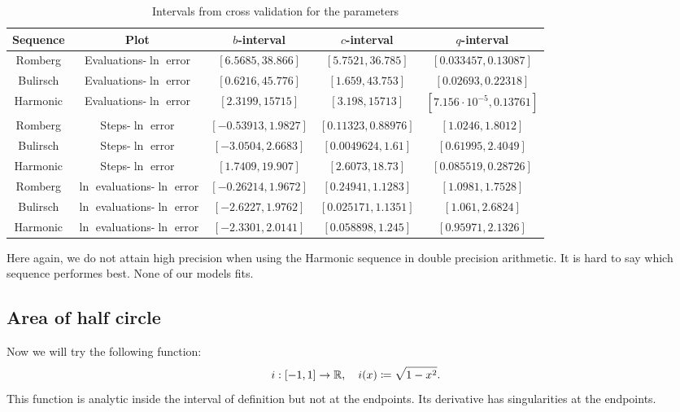 \begin{table}[H]
    \centering
    \begin{tabular}{c|c||c|c|c}
Sequence & Plot & \(b\)-interval & \(c\)-interval & \(q\)-interval\\\hline
Romberg & Evaluations-\(\ln\) error &\([6.5685, 38.866]\) & \([5.7521, 36.785]\) & \([0.033457, 0.13087]\)\\
Bulirsch & Evaluations-\(\ln\) error & \([0.6216, 45.776]\) & \([1.659, 43.753]\) & \([0.02693, 0.22318]\)\\
Harmonic & Evaluations-\(\ln\) error  & \([2.3199,  15715]\) & \([3.198, 15713]\) & \([7.156\cdot 10^{-5}, 0.13761]\)\\
Romberg & Steps-\(\ln\) error & \([-0.53913, 1.9827]\) & \([0.11323, 0.88976]\) & \([1.0246, 1.8012]\)\\
Bulirsch & Steps-\(\ln\) error & \([-3.0504, 2.6683]\) & \([0.0049624, 1.61]\) & \([0.61995, 2.4049]\)\\
Harmonic & Steps-\(\ln\) error  & \([1.7409, 19.907]\) & \([2.6073, 18.73]\) & \([0.085519, 0.28726]\)\\
Romberg & \(\ln\) evaluations-\(\ln\) error & \([-0.26214, 1.9672]\) & \([0.24941, 1.1283]\) & \([1.0981, 1.7528]\)\\
Bulirsch & \(\ln\) evaluations-\(\ln\) error & \([-2.6227, 1.9762]\) & \([0.025171, 1.1351]\) & \([1.061, 2.6824]\)\\
Harmonic & \(\ln\) evaluations-\(\ln\) error & \([-2.3301, 2.0141]\) & \([0.058898, 1.245]\) & \([0.95971, 2.1326]\)\\
    \end{tabular}
    \caption{Intervals from cross validation for the parameters}
    \label{tab:my_label}
\end{table}

Here again, we do not attain high precision when using the Harmonic sequence in double precision arithmetic. It is hard to say which sequence performes best. None of our models fits.

\subsection{Area of half circle}

Now we will try the following function:
\[
i: [-1, 1] \rightarrow \mathbb{R}, \quad i(x)\coloneqq \sqrt{1-x^2}.
\]
This function is analytic inside the interval of definition but not at the endpoints. Its derivative has singularities at the endpoints.

